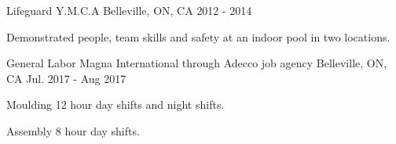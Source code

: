 

\begin{cventries}
	
	
	\cventry
	{Lifeguard} %
	{Y.M.C.A} %
	{Belleville, ON, CA} %
	{2012 - 2014} %
	{
		\begin{cvitems} %
			\item {Demonstrated people, team skills and safety at an indoor pool in two locations.}
		\end{cvitems}
	}
	
	\cventry
	{General Labor} %
	{Magna International through Adecco job agency} %
	{Belleville, ON, CA} %
	{Jul. 2017 - Aug 2017} %
	{
		\begin{cvitems} %
			\item {Moulding 12 hour day shifts and night shifts.}
			\item {Assembly 8 hour day shifts.}
		\end{cvitems}
	}
	
\end{cventries}



